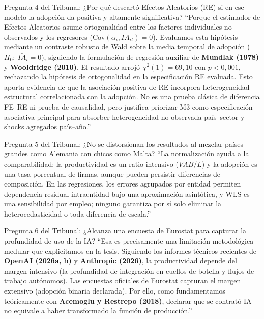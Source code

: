 \documentclass[10pt,a4paper,landscape]{article}
\begin{document}
\vspace{0.25cm}

\begin{qspeechbox}{Pregunta 4 del Tribunal: ¿Por qué descartó Efectos Aleatorios (RE) si en ese modelo la adopción da positiva y altamente significativa?}
  ``Porque el estimador de Efectos Aleatorios asume ortogonalidad entre los factores individuales no observados y los regresores ($\text{Cov}(\alpha_i, IA_{it}) = 0$). Evaluamos esta hipótesis mediante un contraste robusto de Wald sobre la media temporal de adopción ($H_0:\ \bar{IA}_i = 0$), siguiendo la formulación de regresión auxiliar de \textbf{Mundlak (1978)} y \textbf{Wooldridge (2010)}. El resultado arrojó $\chi^2(1) = 69{,}10$ con $p < 0{,}001$, rechazando la hipótesis de ortogonalidad en la especificación RE evaluada. Esto aporta evidencia de que la asociación positiva de RE incorpora heterogeneidad estructural correlacionada con la adopción. No es una prueba clásica de diferencia FE--RE ni prueba de causalidad, pero justifica priorizar M3 como especificación asociativa principal para absorber heterogeneidad no observada país--sector y shocks agregados país--año.''
\end{qspeechbox}

\vspace{0.25cm}

\begin{qspeechbox}{Pregunta 5 del Tribunal: ¿No se distorsionan los resultados al mezclar países grandes como Alemania con chicos como Malta?}
  ``La normalización ayuda a la comparabilidad: la productividad es un ratio intensivo ($VAB/L$) y la adopción es una tasa porcentual de firmas, aunque pueden persistir diferencias de composición. En las regresiones, los errores agrupados por entidad permiten dependencia residual intraentidad bajo una aproximación asintótica, y WLS es una sensibilidad por empleo; ninguno garantiza por sí solo eliminar la heterocedasticidad o toda diferencia de escala.''
\end{qspeechbox}

\vspace{0.25cm}

\begin{qspeechbox}{Pregunta 6 del Tribunal: ¿Alcanza una encuesta de Eurostat para capturar la profundidad de uso de la IA?}
  ``Esa es precisamente una limitación metodológica medular que explicitamos en la tesis. Siguiendo los informes técnicos recientes de \textbf{OpenAI (2026a, b)} y \textbf{Anthropic (2026)}, la productividad depende del margen intensivo (la profundidad de integración en cuellos de botella y flujos de trabajo autónomos). Las encuestas oficiales de Eurostat capturan el margen extensivo (adopción binaria declarada). Por ello, como fundamentamos teóricamente con \textbf{Acemoglu y Restrepo (2018)}, declarar que se contrató IA no equivale a haber transformado la función de producción.''
\end{qspeechbox}
\end{document}
